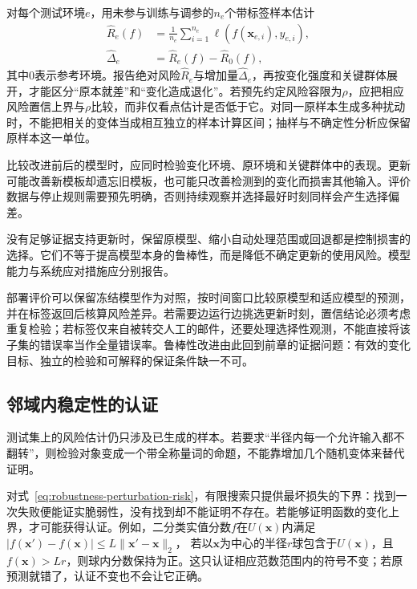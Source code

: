 对每个测试环境$e$，用未参与训练与调参的$n_e$个带标签样本估计
\begin{equation}
 \begin{aligned}
 \widehat R_e(f)&=\frac{1}{n_e}\sum_{i=1}^{n_e}
       \ell(f(\bm{x}_{e,i}),y_{e,i}),\\
 \widehat\Delta_e&=\widehat R_e(f)-\widehat R_0(f),
 \end{aligned}
 \label{eq:robustness-environment-test}
\end{equation}
其中$0$表示参考环境。报告绝对风险$\widehat R_e$与增加量$\widehat\Delta_e$，再按变化强度和关键群体展开，才能区分“原本就差”和“变化造成退化”。若预先约定风险容限为$\rho$，应把相应风险置信上界与$\rho$比较，而非仅看点估计是否低于它。对同一原样本生成多种扰动时，不能把相关的变体当成相互独立的样本计算区间；抽样与不确定性分析应保留原样本这一单位。

比较改进前后的模型时，应同时检验变化环境、原环境和关键群体中的表现。更新可能改善新模板却遗忘旧模板，也可能只改善检测到的变化而损害其他输入。评价数据与停止规则需要预先明确，否则持续观察并选择最好时刻同样会产生选择偏差。

没有足够证据支持更新时，保留原模型、缩小自动处理范围或回退都是控制损害的选择。它们不等于提高模型本身的鲁棒性，而是降低不确定更新的使用风险。模型能力与系统应对措施应分别报告。

部署评价可以保留冻结模型作为对照，按时间窗口比较原模型和适应模型的预测，并在标签返回后核算风险差异。若需要边运行边挑选更新时刻，置信结论必须考虑重复检验；若标签仅来自被转交人工的邮件，还要处理选择性观测，不能直接将该子集的错误率当作全量错误率。鲁棒性改进由此回到前章的证据问题：有效的变化目标、独立的检验和可解释的保证条件缺一不可。

\subsection{邻域内稳定性的认证}
\label{sec:robustness-certification}

测试集上的风险估计仍只涉及已生成的样本。若要求“半径内每一个允许输入都不翻转”，则检验对象变成一个带全称量词的命题，不能靠增加几个随机变体来替代证明。

对式~\eqref{eq:robustness-perturbation-risk}，有限搜索只提供最坏损失的下界：找到一次失败便能证实脆弱性，没有找到却不能证明不存在。若能够证明函数的变化上界，才可能获得认证。例如，二分类实值分数$f$在$U(\bm{x})$内满足
$|f(\bm{x}')-f(\bm{x})|\leq L\lVert\bm{x}'-\bm{x}\rVert_2$，
若以$\bm{x}$为中心的半径$r$球包含于$U(\bm{x})$，且$f(\bm{x})>Lr$，则球内分数保持为正。这只认证相应范数范围内的符号不变；若原预测就错了，认证不变也不会让它正确。

